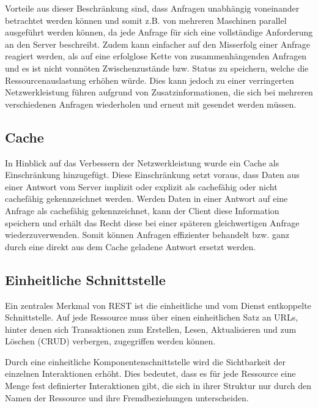 Vorteile aus dieser Beschränkung sind, dass Anfragen unabhängig voneinander betrachtet werden können
und somit z.B. von mehreren Maschinen parallel ausgeführt werden können, da jede Anfrage für sich eine vollständige Anforderung an den Server beschreibt.
Zudem kann einfacher auf den Misserfolg einer Anfrage reagiert werden, als auf eine erfolglose Kette von zusammenhängenden Anfragen
und es ist nicht vonnöten Zwischenzustände bzw. Status zu speichern, welche die Ressourcenauslastung erhöhen würde.
Dies kann jedoch zu einer verringerten Netzwerkleistung führen aufgrund von Zusatzinformationen,
die sich bei mehreren verschiedenen Anfragen wiederholen und erneut mit gesendet werden müssen.

\subsection{Cache}
In Hinblick auf das Verbessern der Netzwerkleistung wurde ein Cache als Einschränkung hinzugefügt.
Diese Einschränkung setzt voraus, dass Daten aus einer Antwort vom Server implizit oder explizit als cachefähig oder nicht cachefähig gekennzeichnet werden.
Werden Daten in einer Antwort auf eine Anfrage als cachefähig gekennzeichnet, kann der Client diese Information speichern und erhält das Recht diese
bei einer späteren gleichwertigen Anfrage wiederzuverwenden.
Somit können Anfragen effizienter behandelt bzw. ganz durch eine direkt aus dem Cache geladene Antwort ersetzt werden.

\subsection{Einheitliche Schnittstelle}
\label{sec:basics:restapi:interface}
Ein zentrales Merkmal von REST ist die einheitliche und vom Dienst entkoppelte Schnittstelle.
Auf jede Ressource muss über einen einheitlichen Satz an URLs, hinter denen sich Transaktionen zum Erstellen, Lesen, Aktualisieren
und zum Löschen (CRUD) verbergen, zugegriffen werden können.

Durch eine einheitliche Komponentenschnittstelle wird die Sichtbarkeit der einzelnen Interaktionen erhöht.
Dies bedeutet, dass es für jede Ressource eine Menge fest definierter Interaktionen gibt, die sich in ihrer Struktur nur durch den Namen der
Ressource und ihre Fremdbeziehungen unterscheiden.

